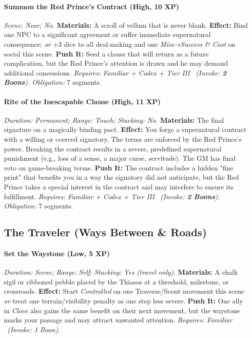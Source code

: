 \documentclass[12pt,twoside]{book}
\begin{document}
\paragraph{Summon the Red Prince's Contract (High, 10 XP)} \emph{Scene; Near; No.}
\textbf{Materials:} A scroll of vellum that is never blank.
\textbf{Effect:} Bind one NPC to a significant agreement or suffer immediate supernatural consequence; \emph{or} +3 dice to all deal-making and one \emph{Miss→Success \& Cost} on social this scene.
\textbf{Push It:} Seed a clause that will return as a future complication, but the Red Prince's attention is drawn and he may demand additional concessions.
\emph{Requires: Familiar + Codex + Tier III \ (\textit{Invoke:} \textbf{2 Boons}).}
\emph{Obligation:} 7 segments.

\paragraph{Rite of the Inescapable Clause (High, 11 XP)} \emph{Duration: Permanent; Range: Touch; Stacking: No.}
\textbf{Materials:} The final signature on a magically binding pact.
\textbf{Effect:} You forge a supernatural contract with a willing or coerced signatory. The terms are enforced by the Red Prince's power. Breaking the contract results in a severe, predefined supernatural punishment (e.g., loss of a sense, a major curse, servitude). The GM has final veto on game-breaking terms.
\textbf{Push It:} The contract includes a hidden "fine print" that benefits you in a way the signatory did not anticipate, but the Red Prince takes a special interest in the contract and may interfere to ensure its fulfillment.
\emph{Requires: Familiar + Codex + Tier III \ (\textit{Invoke:} \textbf{2 Boons}).}
\emph{Obligation:} 7 segments.

\subsection{The Traveler (Ways Between \& Roads)}
\paragraph{Set the Waystone (Low, 5 XP)} \emph{Duration: Scene; Range: Self; Stacking: Yes (travel only).}
\textbf{Materials:} A chalk sigil or ribboned pebble placed by the Thiasos at a threshold, milestone, or crossroads.
\textbf{Effect:} Start \emph{Controlled} on one Traverse/Scout movement this scene \emph{or} treat one terrain/visibility penalty as one step less severe.
\textbf{Push It:} One ally in \emph{Close} also gains the same benefit on their next movement, but the waystone marks your passage and may attract unwanted attention.
\emph{Requires: Familiar \ (\textit{Invoke:} 1 Boon).}
\end{document}
